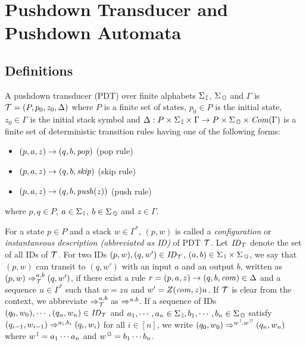 \section{Pushdown Transducer and Pushdown Automata}
\subsection{Definitions}
\begin{definition}
A {pushdown transducer} (PDT)
over finite alphabets $\Sigma_{\, \mathbb{I}}$, $\Sigma_{\, \mathbb{O}}$ and $\Gamma$
is ${\cal T}=(P, p_0, z_0, \Delta)$ where
$P$ is a finite set of states,
$p_0\in P$ is the initial state,
$z_0\in \Gamma$ is the initial stack symbol and
$\Delta: P\times \Sigma_{\, \mathbb{I}} \times \Gamma \to P\times \Sigma_{\, \mathbb{O}} \times \mathit{Com}(\Gamma)$ is a finite set of deterministic transition rules having one of the following forms:
\begin{itemize}
\item $(p, a, z) \rightarrow (q, b, \mathit{pop})$ \quad (pop rule)
\item $(p, a, z) \rightarrow (q, b, \mathit{skip})$ \quad (skip rule)
\item $(p, a, z) \rightarrow (q, b, \mathit{push}(z))$ \quad (push rule)
\end{itemize}
where $p, q\in P$, $a\in\Sigma_{\, \mathbb{I}}$, $b\in\Sigma_{\, \mathbb{O}}$ and $z\in\Gamma$.
\end{definition}
\noindent
For a state $p\in P$ and
a stack $w \in \Gamma^*$,
$(p, w)$ is called
a {\em configuration} or {\em instantaneous description (abbreviated as ID)} of PDT ${\cal T}$. Let $\mathit{ID}_{\cal T}$ denote the set of all IDs of ${\cal T}$.
For two IDs $(p, w), (q, w')\in \mathit{ID}_\mathcal{T}$, $(a,b)\in\Sigma_{\, \mathbb{I}} \times \Sigma_{\, \mathbb{O}}$,
we say that $(p, w)$ can transit to $(q, w')$ with an input $a$ and an output $b$, written as $(p, w) \Rightarrow_{{\cal T}}^{a, b} (q, w')$, if there exist a rule $r=(p, a, z) \rightarrow (q, b, \mathit{com}) \in \Delta$ and a sequence $u\in \Gamma^*$ such that $w=zu$ and $w'=Z(\mathit{com},z)u$.
If ${\cal T}$ is clear from the context,
we abbreviate
$\Rightarrow_{{\cal T}}^{a, b}$ as $\Rightarrow^{a, b}$.
If a sequence of IDs $(q_0, w_0), \cdots, (q_n, w_n)\in \mathit{ID}_{\cal T}$
and $a_1, \cdots, a_n\in\Sigma_{\, \mathbb{I}}, b_1, \cdots, b_n\in \Sigma_{\, \mathbb{O}}$ satisfy $(q_{i-1}, w_{i-1})\Rightarrow^{a_i, b_i}(q_i, w_i)$ for all $i\in[n]$, we write $(q_0, w_0)\Rightarrow^{w^{\, \mathbb{I}}, w^{\, \mathbb{O}}}(q_n, w_n)$
where $w^{\, \mathbb{I}} = a_1 \cdots a_n$ and $w^{\, \mathbb{O}} = b_1 \cdots b_n$.

